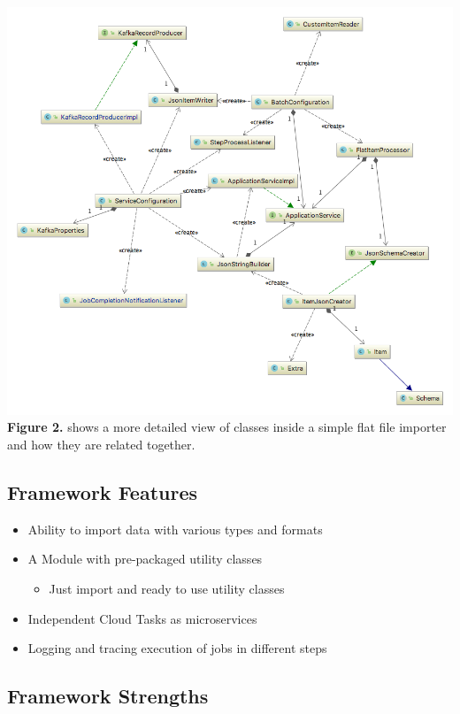 \includegraphics{images/domain_model.png} \textbf{Figure 2.} shows a
more detailed view of classes inside a simple flat file importer and how
they are related together.

\subsection{Framework Features}\label{framework-features}

\begin{itemize}
\tightlist
\item
  Ability to import data with various types and formats
\item
  A Module with pre-packaged utility classes

  \begin{itemize}
  \tightlist
  \item
    Just import and ready to use utility classes
  \end{itemize}
\item
  Independent Cloud Tasks as microservices
\item
  Logging and tracing execution of jobs in different steps
\end{itemize}

\subsection{Framework Strengths}\label{framework-strengths}

